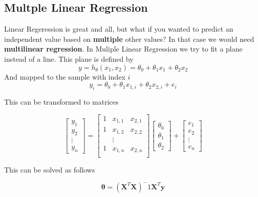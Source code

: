 \documentclass[a4paper, 11pt]{article}
\begin{document}
\subsection{Multple Linear Regression}

Linear Regeression is great and all, but what if you wanted to predict an independent value based on \textbf{multiple} other values? In that case we would need \textbf{multilinear regression}. 
\noindent
In Muliple Linear Regression we try to fit a plane instead of a line. This plane is defined by 
\begin{equation}
	y = h_\theta(x_1,x_2) = \theta_0 + \theta_1 x_1 + \theta_2 x_2
\end{equation}
And mapped to the sample with index $i$
\begin{equation*}
	y_i = \theta_0 + \theta_1 x_{1,i} + \theta_2 x_{2,i} + e_i
\end{equation*}

This can be transformed to matrices

\begin{equation*}
	\begin{bmatrix}
		y_1\\
		y_2\\
		\vdots\\
		y_n
	\end{bmatrix}
	=
	\begin{bmatrix}
		1 & x_{1,1} & x_{2,1}\\
		1 & x_{1,2} & x_{2,2}\\
		 & \vdots & \\
		1 & x_{1,n} & x_{2,n}\\
	\end{bmatrix}
 	\begin{bmatrix}
		\theta_0\\
		\theta_1\\
		\theta_2
	\end{bmatrix}
	+
	\begin{bmatrix}
		e_1\\
		e_2\\
		\vdots\\
		e_n
	\end{bmatrix}
\end{equation*}

This can be solved as follows

\begin{equation*}
	\bm{\theta} = (\bm{X}^T\bm{X})^-1\bm{X}^T\bm{y}
\end{equation*}
\end{document}
